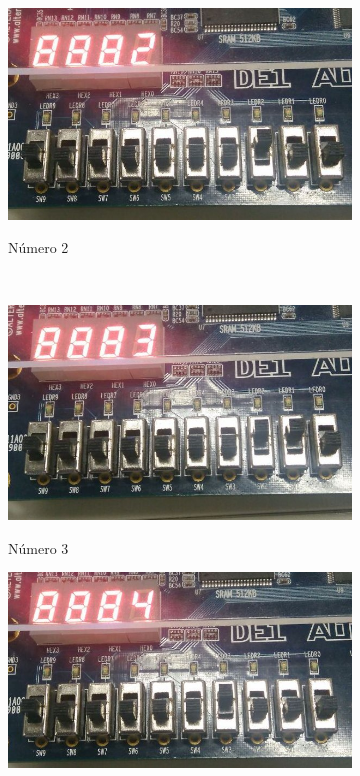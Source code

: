 \begin{figure}[H]
			\begin{subfigure}[b]{0.44\textwidth}
				\includegraphics[width=\textwidth]{img/etapa1/2}
				\label{fig:etapa1-2}
				\caption{Número 2}
			\end{subfigure}
			~
			\begin{subfigure}[b]{0.44\textwidth}
				\includegraphics[width=\textwidth]{img/etapa1/3}
				\label{fig:etapa1-3}
				\caption{Número 3}
			\end{subfigure}
			\begin{subfigure}[b]{0.44\textwidth}
				\includegraphics[width=\textwidth]{img/etapa1/4}

\end{subfigure}
\end{figure}
